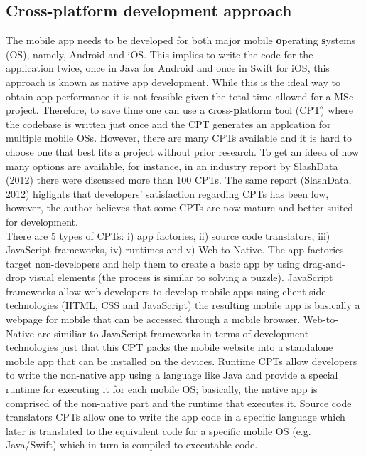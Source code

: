 \documentclass[version=last,fontsize=13pt]{scrartcl}
\begin{document}
	\subsection{Cross-platform development approach}
	The mobile app needs to be developed for both major mobile \textbf{o}perating \textbf{s}ystems (OS), namely, Android and iOS. This implies  to write the code for the application twice, once in Java  for Android and once in Swift for iOS, this approach is known as native app development. While this is the ideal way to obtain app performance it is not feasible given the total time allowed for a MSc project. Therefore, to save time one can use a \textbf{c}ross-\textbf{p}latform \textbf{t}ool (CPT) where the codebase is written just once and the CPT generates an applcation for multiple mobile OSs. However, there are many CPTs available and it is hard to choose one that best fits a project without prior research. To get an ideea of how many options are available, for instance, in an industry report by SlashData (2012) there were discussed more than 100 CPTs. The same report (SlashData, 2012) higlights that developers' satisfaction regarding CPTs has been low, however, the author believes that some CPTs are now mature and better suited for development. \\
	\indent
	There are 5 types of CPTs: i) app factories, ii) source code translators, iii) JavaScript frameworks, iv) runtimes and v) Web-to-Native. The app factories target non-developers and help them to create a basic app by using drag-and-drop visual elements (the process is similar to solving a puzzle). JavaScript frameworks allow web developers to develop mobile apps using client-side technologies (HTML, CSS and JavaScript) the resulting mobile app is basically a webpage for mobile that can be accessed through a mobile browser. Web-to-Native are similiar to JavaScript frameworks in terms of development technologies just that this CPT packs the mobile website into a standalone mobile app that can be installed on the devices. 
	Runtime CPTs allow developers to write the non-native app using a language like Java and provide a special runtime for executing it for each mobile OS; basically,  the native app is comprised of the non-native part and the runtime that executes it.  
	Source code translators CPTs allow one to write the app code in a specific language which later is translated to the equivalent code for a specific mobile OS (e.g. Java/Swift) which in turn is compiled to executable code.\\
\end{document}
